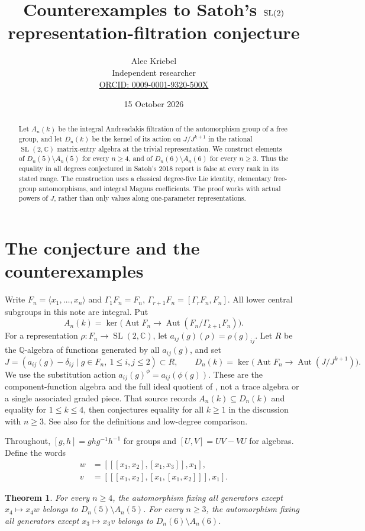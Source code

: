 \documentclass[11pt,letterpaper]{article}
\title{Counterexamples to Satoh's \texorpdfstring{$\SL(2)$}{SL(2)}\protect\\ representation-filtration conjecture}
\author{Alec Kriebel\\\small Independent researcher\\
\small\href{https://orcid.org/0009-0001-9320-500X}{ORCID: 0009-0001-9320-500X}}
\date{15 October 2026}
\newtheorem{theorem}{Theorem}
\newcommand{\Aut}{\operatorname{Aut}}
\newcommand{\SL}{\operatorname{SL}}
\newcommand{\Q}{\mathbb{Q}}
\newcommand{\C}{\mathbb{C}}
\begin{document}
\maketitle
\begin{abstract}
Let $A_n(k)$ be the integral Andreadakis filtration of the automorphism group
of a free group, and let $D_n(k)$ be the kernel of its action on
$J/J^{k+1}$ in the rational $\SL(2,\C)$ matrix-entry algebra at the trivial
representation. We construct elements of $D_n(5)\setminus A_n(5)$ for every
$n\geq4$, and of $D_n(6)\setminus A_n(6)$ for every $n\geq3$.
Thus the equality in all degrees conjectured in Satoh's 2018 report is false
at every rank in its stated range. The construction uses a classical
degree-five Lie identity, elementary free-group automorphisms, and integral
Magnus coefficients. The proof works with actual powers of $J$, rather than
only values along one-parameter representations.
\end{abstract}

\section{The conjecture and the counterexamples}
Write $F_n=\langle x_1,\ldots,x_n\rangle$ and
$\Gamma_1F_n=F_n$, $\Gamma_{r+1}F_n=[\Gamma_rF_n,F_n]$.
All lower central subgroups in this note are integral. Put
\[
 A_n(k)=\ker\bigl(\Aut F_n\longrightarrow
                  \Aut(F_n/\Gamma_{k+1}F_n)\bigr).
\]
For a representation $\rho:F_n\to\SL(2,\C)$, let
$a_{ij}(g)(\rho)=\rho(g)_{ij}$.
Let $R$ be the $\Q$-algebra of functions generated by all $a_{ij}(g)$, and set
\[
 J=(a_{ij}(g)-\delta_{ij}\mid g\in F_n,\ 1\leq i,j\leq2)\subset R,
 \qquad
 D_n(k)=\ker\bigl(\Aut F_n\longrightarrow\Aut(J/J^{k+1})\bigr).
\]
We use the substitution action $a_{ij}(g)^\phi=a_{ij}(\phi(g))$.
These are the component-function algebra and the full ideal quotient of
\cite[pp.~88--89]{SatohOWR}, not a trace algebra or a single associated
graded piece. That source records $A_n(k)\subseteq D_n(k)$ and equality for
$1\leq k\leq4$, then conjectures equality for all $k\geq1$ in the discussion
with $n\geq3$. See also \cite[\S4.2, Theorem~6.3]{SatohPreprint} for the
definitions and low-degree comparison.

Throughout, $[g,h]=ghg^{-1}h^{-1}$ for groups and $[U,V]=UV-VU$ for algebras.
Define the words
\begin{align}
 w&=[[[x_1,x_2],[x_1,x_3]],x_1],\label{eq:w}\\
 v&=[[[x_1,x_2],[x_1,[x_1,x_2]]],x_1].\label{eq:v}
\end{align}
\begin{theorem}\label{thm:main}
For every $n\geq4$, the automorphism fixing all generators except
$x_4\mapsto x_4w$ belongs to $D_n(5)\setminus A_n(5)$.
For every $n\geq3$, the automorphism fixing all generators except
$x_3\mapsto x_3v$ belongs to $D_n(6)\setminus A_n(6)$.
\end{theorem}
\end{document}
